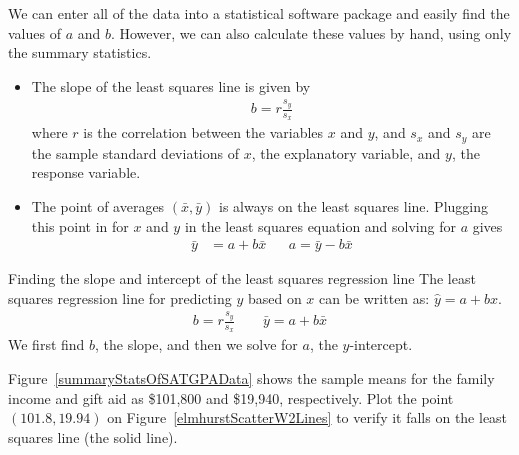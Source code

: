 We can enter all of the data into a statistical software package and easily find the values of $a$ and $b$.  However, we can also calculate these values by hand, using only the summary statistics.
\begin{itemize}
\item The slope of the least squares line is given by
\begin{eqnarray*}
b = r\frac{s_y}{s_x}
\label{slopeOfLSRLine}
\end{eqnarray*}
where $r$ is the correlation between the variables $x$ and $y$, and $s_x$ and $s_y$ are the sample standard deviations of $x$, the explanatory variable, and $y$, the response variable.
\item The point of averages $(\bar{x}, \bar{y})$ is always on the least squares line. Plugging this point in for $x$ and $y$ in the least squares equation and solving for $a$ gives
\begin{align*}
\bar{y} &= a  + b\bar{x}
&&a=\bar{y}-b\bar{x}
\end{align*}
\label{interceptOfLSRLine}

\end{itemize}


\begin{onebox}{Finding the slope and intercept of the least squares regression line}
The least squares regression line for predicting $y$ based on $x$ can be written as:  $\hat{y}=a+bx$.  
\begin{align*}
b=r\frac{s_y}{s_x} \qquad \bar{y} = a + b\bar{x}
\end{align*}
We first find $b$, the slope, and then we solve for $a$, the $y$-intercept.  
\end{onebox}

\begin{exercisewrap}
\begin{nexercise}
Figure~\ref{summaryStatsOfSATGPAData} shows the sample means for the family income and gift aid as \$101,800 and \$19,940, respectively. Plot the point $(101.8, 19.94)$ on Figure~\ref{elmhurstScatterW2Lines} to verify it falls on the least squares line (the solid line).\footnotemark 
\end{nexercise}
\end{exercisewrap}

